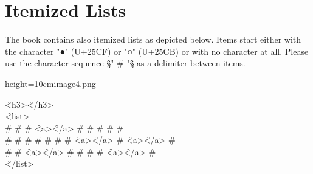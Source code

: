 \documentclass[fontsize=11pt, paper=a4, 
  DIV15,
  normalheadings,
  parskip=half-, 
  pointlessnumbers]{scrartcl}
\begin{document}
\section{Itemized Lists}
\begin{mainrule}
  The book contains also itemized lists as depicted below. Items start
  either with the character "●" (U+25CF) or "○" (U+25CB) or with no character at all.
  Please use the character sequence §" # "§ as a delimiter between items.
\end{mainrule}
\vspace{3mm}

\begin{sampleImageSmall}{height=10cm}{image4.png}
  \begin{typeChinese}
    \f{<h3>}\f{</h3>}\\
    \f{<list>}\\
    \f{ # }\f{ # }\f{ # }\f{<a>}\f{</a>}\f{ # }\f{ # }\f{ # }\f{ # }\f{ # }\\
    \f{ # }\f{ # }\f{ # }\f{ # }\f{ # }\f{ # }\f{ # }\f{<a>}\f{</a>}\f{ # }\f{<a>}\f{</a> # }\\
    \f{ # }\f{ # }\f{<a>}\f{</a>}\f{ # }\f{ # }\f{ # }\f{ # }\f{<a>}\f{</a>}\f{ # }\\
    \f{</list>}
  \end{typeChinese}
\end{sampleImageSmall}
\end{document}
